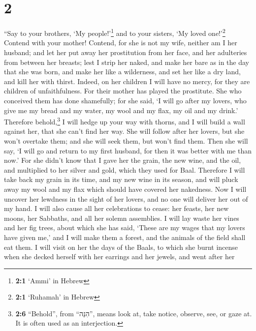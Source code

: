 \hypertarget{section-1}{%
\section{2}\label{section-1}}

 ``Say to your brothers, `My people!'\footnote{\textbf{2:1}
  `Ammi' in Hebrew} and to your sisters, `My loved one!'\footnote{\textbf{2:1}
  `Ruhamah' in Hebrew}  Contend with your mother! Contend,
for she is not my wife, neither am I her husband; and let her put away
her prostitution from her face, and her adulteries from between her
breasts;  lest I strip her naked, and make her bare as in
the day that she was born, and make her like a wilderness, and set her
like a dry land, and kill her with thirst.  Indeed, on her
children I will have no mercy, for they are children of unfaithfulness.
 For their mother has played the prostitute. She who
conceived them has done shamefully; for she said, `I will go after my
lovers, who give me my bread and my water, my wool and my flax, my oil
and my drink.'  Therefore behold,\footnote{\textbf{2:6}
  ``Behold'', from ``הִנֵּה'', means look at, take notice, observe, see,
  or gaze at. It is often used as an interjection.} I will hedge up your
way with thorns, and I will build a wall against her, that she can't
find her way.  She will follow after her lovers, but she
won't overtake them; and she will seek them, but won't find them. Then
she will say, `I will go and return to my first husband, for then it was
better with me than now.'  For she didn't know that I gave
her the grain, the new wine, and the oil, and multiplied to her silver
and gold, which they used for Baal.  Therefore I will take
back my grain in its time, and my new wine in its season, and will pluck
away my wool and my flax which should have covered her nakedness.
 Now I will uncover her lewdness in the sight of her
lovers, and no one will deliver her out of my hand.  I
will also cause all her celebrations to cease: her feasts, her new
moons, her Sabbaths, and all her solemn assemblies.  I
will lay waste her vines and her fig trees, about which she has said,
`These are my wages that my lovers have given me,' and I will make them
a forest, and the animals of the field shall eat them.  I
will visit on her the days of the Baals, to which she burnt incense when
she decked herself with her earrings and her jewels, and went after her
